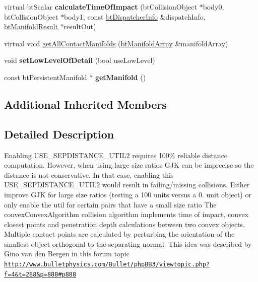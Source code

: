 \begin{DoxyCompactItemize}
virtual bt\+Scalar {\bfseries calculate\+Time\+Of\+Impact} (bt\+Collision\+Object $\ast$body0, bt\+Collision\+Object $\ast$body1, const \hyperlink{structbtDispatcherInfo}{bt\+Dispatcher\+Info} \&dispatch\+Info, \hyperlink{classbtManifoldResult}{bt\+Manifold\+Result} $\ast$result\+Out)
\item 
virtual void \hyperlink{classbtConvexConvexAlgorithm_aa2a195cdd3b45c169c15ea2de85c4038}{get\+All\+Contact\+Manifolds} (\hyperlink{classbtAlignedObjectArray}{bt\+Manifold\+Array} \&manifold\+Array)
\item 
\mbox{\label{classbtConvexConvexAlgorithm_a64464ed857fba6750ded542c47ee4e45}} 
void {\bfseries set\+Low\+Level\+Of\+Detail} (bool use\+Low\+Level)
\item 
\mbox{\label{classbtConvexConvexAlgorithm_a16a0cc2ea9ef78c3417ab93c3bfff012}} 
const bt\+Persistent\+Manifold $\ast$ {\bfseries get\+Manifold} ()
\end{DoxyCompactItemize}
\subsection*{Additional Inherited Members}


\subsection{Detailed Description}
Enabling U\+S\+E\+\_\+\+S\+E\+P\+D\+I\+S\+T\+A\+N\+C\+E\+\_\+\+U\+T\+I\+L2 requires 100\% reliable distance computation. However, when using large size ratios G\+JK can be imprecise so the distance is not conservative. In that case, enabling this U\+S\+E\+\_\+\+S\+E\+P\+D\+I\+S\+T\+A\+N\+C\+E\+\_\+\+U\+T\+I\+L2 would result in failing/missing collisions. Either improve G\+JK for large size ratios (testing a 100 units versus a 0. unit object) or only enable the util for certain pairs that have a small size ratio The convex\+Convex\+Algorithm collision algorithm implements time of impact, convex closest points and penetration depth calculations between two convex objects. Multiple contact points are calculated by perturbing the orientation of the smallest object orthogonal to the separating normal. This idea was described by Gino van den Bergen in this forum topic \href{http://www.bulletphysics.com/Bullet/phpBB3/viewtopic.php?f=4&t=288&p=888#p888}{\tt http\+://www.\+bulletphysics.\+com/\+Bullet/php\+B\+B3/viewtopic.\+php?f=4\&t=288\&p=888\#p888} 

